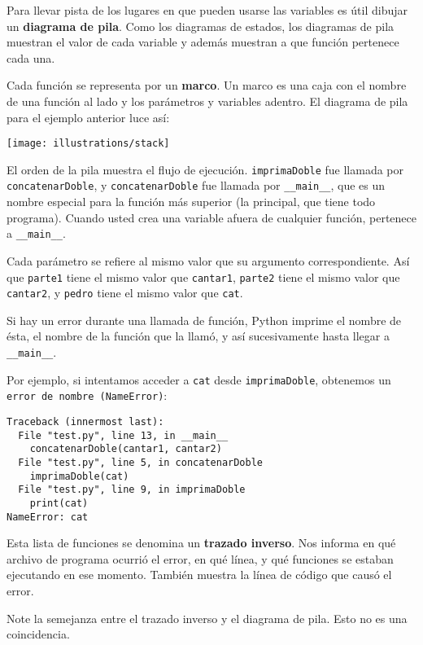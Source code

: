 \label{stackdiagram}  

Para llevar pista de los lugares en que pueden usarse las variables
es útil dibujar un \textbf{diagrama de pila}. Como los diagramas de
estados, los diagramas de pila muestran el valor de cada variable
y además muestran a que función pertenece cada una.

Cada función se representa por un \textbf{marco}. Un marco es una
caja con el nombre de una función al lado y los parámetros y variables
adentro. El diagrama de pila para el ejemplo anterior luce así:

\beforefig \centerline{\texttt{[image: illustrations/stack]}}
\afterfig

El orden de la pila muestra el flujo de ejecución. \texttt{imprimaDoble}
fue llamada por \texttt{concatenarDoble}, y \texttt{concatenarDoble}
fue llamada por \texttt{\_\_main\_\_}, que es un nombre especial para
la función más superior (la principal, que tiene todo programa). Cuando
usted crea una variable afuera de cualquier función, pertenece a \texttt{\_\_main\_\_}.

Cada parámetro se refiere al mismo valor que su argumento correspondiente.
Así que \texttt{parte1} tiene el mismo valor que \texttt{cantar1},
\texttt{parte2} tiene el mismo valor que \texttt{cantar2}, y \texttt{pedro}
tiene el mismo valor que \texttt{cat}.

Si hay un error durante una llamada de función, Python imprime el
nombre de ésta, el nombre de la función que la llamó, y así sucesivamente
hasta llegar a \texttt{\_\_main\_\_}.

Por ejemplo, si intentamos acceder a \texttt{cat} desde \texttt{imprimaDoble},
obtenemos un \texttt{error de nombre (NameError)}:
\begin{verbatim}
Traceback (innermost last):
  File "test.py", line 13, in __main__
    concatenarDoble(cantar1, cantar2)
  File "test.py", line 5, in concatenarDoble
    imprimaDoble(cat)
  File "test.py", line 9, in imprimaDoble
    print(cat)
NameError: cat
\end{verbatim}
Esta lista de funciones se denomina un \textbf{trazado inverso}. Nos
informa en qué archivo de programa ocurrió el error, en qué línea,
y qué funciones se estaban ejecutando en ese momento. También muestra
la línea de código que causó el error.


Note la semejanza entre el trazado inverso y el diagrama de pila.
Esto no es una coincidencia.

